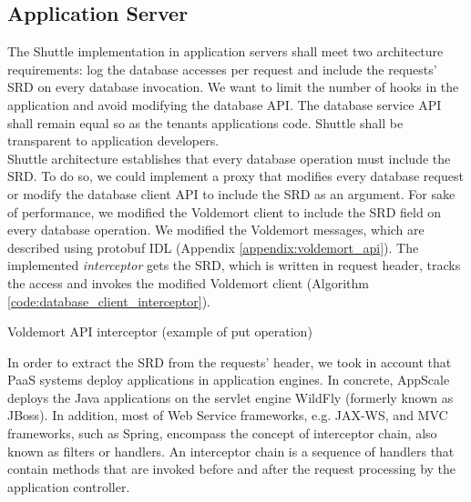 \subsection{Application Server}\label{sec:impl:normal:compute}
The Shuttle implementation in application servers shall meet two architecture requirements: log the database accesses per request and include the requests' \ac{SRD} on every database invocation. We want to limit the number of hooks in the application and avoid modifying the database \ac{API}. The database service \ac{API} shall remain equal so as the tenants applications code. Shuttle shall be transparent to application developers.\\


Shuttle architecture establishes that every database operation must include the \acf{SRD}. To do so, we could implement a proxy that modifies every database request or modify the database client \ac{API} to include the \ac{SRD} as an argument. For sake of performance, we modified the Voldemort client to include the \ac{SRD} field on every database operation. We modified the Voldemort messages, which are described using \acf{protobuf} \acs{IDL} (Appendix \ref{appendix:voldemort_api}). The implemented \emph{interceptor} gets the \ac{SRD}, which is written in request header, tracks the access and invokes the modified Voldemort client (Algorithm \ref{code:database_client_interceptor}).

\begin{algorithm}
\DontPrintSemicolon{}
 
\caption{Voldemort \ac{API} interceptor (example of put operation)}\label{code:database_client_interceptor}
\end{algorithm}

In order to extract the \ac{SRD} from the requests' header, we took in account that \ac{PaaS} systems deploy applications in application engines. In concrete, AppScale deploys the Java applications on the servlet engine WildFly \cite{wildfly} (formerly known as JBoss). In addition, most of Web Service frameworks, e.g. \ac{JAX-WS}, and \acf{MVC} frameworks, such as Spring, encompass the concept of interceptor chain, also known as filters or handlers. An interceptor chain is a sequence of handlers that contain methods that are invoked before and after the request processing by the application controller.

